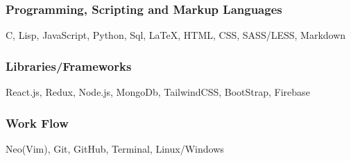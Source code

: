 \documentclass[11pt, oneside, a4paper, titlepage]{article}
\begin{document}
\begin{tcolorbox}
\begin{minipage}[t]{8cm}
\begin{tcolorbox}[grow to left by=0.6cm,colback=gray!25,colframe=white]
        \subsubsection{Programming, Scripting and Markup Languages}
        C, Lisp, JavaScript, Python, Sql, {\LaTeX}, HTML, CSS, SASS/LESS, Markdown

        \subsubsection{Libraries/Frameworks}
        React.js, Redux, Node.js, MongoDb, TailwindCSS, BootStrap, Firebase

        \subsubsection{Work Flow}
        Neo(Vim), Git, GitHub, Terminal, Linux/Windows
    \end{tcolorbox}
  \end{minipage}
\end{tcolorbox}
\end{document}
